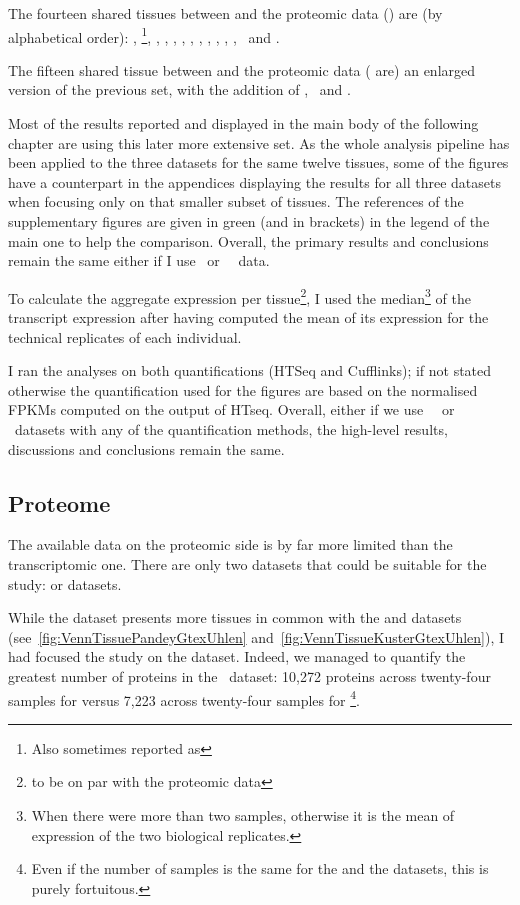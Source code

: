 The fourteen shared tissues between  and the proteomic data
() are
(by alphabetical order): \adrenal, \Bladder{}\footnote{Also
sometimes reported as },
\hColon, \fcortex, \Oesophagus, \Heart,
\Kidney, \Liver, \Lung, \Ovary, \Pancreas,
\Prostate, \Spinal\ and \Testis.

The fifteen shared tissue between  and the proteomic data
( are)
an enlarged version of the previous set, with the addition of \Gall,
\Placenta\ and \Rectum.

Most of the results reported and displayed in the main body
of the following chapter are using this later more extensive set.
As the whole analysis
pipeline has been applied to the three datasets
for the same twelve tissues, some of the figures have a counterpart in the
appendices displaying the results for all three datasets when focusing only on
that smaller subset of tissues.
The references of the supplementary figures are given in green (and in brackets)
in the legend of the main one to help the comparison.
Overall, the primary results and conclusions remain the same either if
I use \gtex\ or \uhlen\ \etal\ data.

To calculate the aggregate expression per tissue\footnote{to be on par with the
proteomic data}, I used the median\footnote{When there were more than
two samples, otherwise it is the mean of expression of the two biological
replicates.} of the transcript expression after having computed the mean of its
expression for the technical replicates of each individual.

I ran the analyses on both quantifications (HTSeq and Cufflinks); if not stated
otherwise the quantification used for the figures are based on the normalised
\glspl{FPKM} computed on the output of HTseq.
Overall, either if we use \uhlen\ \etal\ or
\gtex\ datasets with any of the quantification methods, the high-level
results, discussions and conclusions remain the same.

\subsection{Proteome}
The available data on the proteomic side is by far more limited than the
transcriptomic one. There are only two datasets that could be suitable for
the study:  or  datasets.

While the  dataset presents more tissues in common
with the  and  datasets
(see~\cref{fig:VennTissuePandeyGtexUhlen}
and~\cref{fig:VennTissueKusterGtexUhlen}), I had focused the study on
the  dataset.
Indeed, we managed to quantify the greatest number of proteins
in the \pandey\ dataset: 10,272 proteins across twenty-four samples for
 versus 7,223 across twenty-four samples for \footnote{Even
if the number of samples is the same for the  and
the  datasets, this is purely fortuitous.}.

